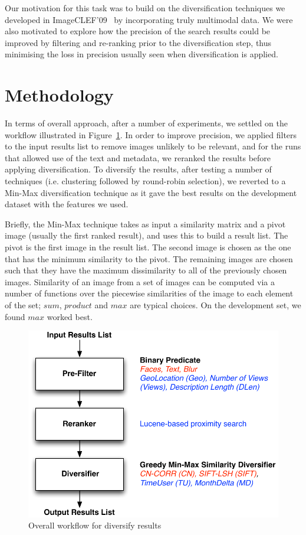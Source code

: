 \documentclass{../acm_proc_article-me11_tweaked}
\begin{document}
Our motivation for this task was to build on the diversification techniques we developed in ImageCLEF'09~\cite{} by incorporating truly multimodal data. We were also motivated to explore how the precision of the search results could be improved by filtering and re-ranking prior to the diversification step, thus minimising the loss in precision usually seen when diversification is applied.

\section{Methodology}\label{sec:meth}
In terms of overall approach, after a number of experiments, we settled on the workflow illustrated in Figure~\ref{fig:overview}. In order to improve precision, we applied filters to the input results list to remove images unlikely to be relevant, and for the runs that allowed use of the text and metadata, we reranked the results before applying diversification. To diversify the results, after testing a number of techniques (i.e. clustering followed by round-robin selection), we reverted to a Min-Max diversification technique as it gave the best results on the development dataset with the features we used. 

Briefly, the Min-Max technique takes as input a similarity matrix and a pivot image (usually the first ranked result), and uses this to build a result list. The pivot is the first image in the result list. The second image is chosen as the one that has the minimum similarity to the pivot. The remaining images are chosen such that they have the maximum dissimilarity to all of the previously chosen images. Similarity of an image from a set of images can be computed via a number of functions over the piecewise similarities of the image to each element of the set; $sum$, $product$ and $max$ are typical choices. On the development set, we found $max$ worked best.

\begin{figure}
	\includegraphics[width=\columnwidth]{images/overview}
	\caption{\label{fig:overview}Overall workflow for diversify results}
\end{figure}
\end{document}

